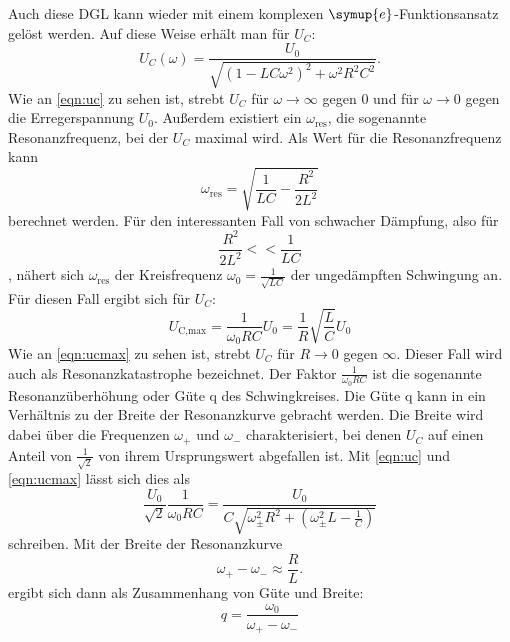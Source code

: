 \noindent Auch diese DGL kann wieder mit einem komplexen $\symup{e}$-Funktionsansatz gelöst werden. Auf diese Weise erhält man für $U_C$:
\begin{equation}
    U_C(\omega) = \frac{U_0}{\sqrt{(1-LC\omega^2)^2 + \omega^2 R^2 C^2}}.
    \label{eqn:uc}
\end{equation}
\noindent Wie an \autoref{eqn:uc} zu sehen ist, strebt $U_C$ für $\omega \to \infty $ gegen 0 und für $\omega \to 0$ gegen die Erregerspannung $U_0$. Außerdem existiert ein $\omega_{\text{res}}$, die sogenannte Resonanzfrequenz, bei der $U_C$ maximal wird. Als Wert für die Resonanzfrequenz kann
\begin{equation}
    \omega_{\text{res}} = \sqrt{\frac{1}{LC}-\frac{R^2}{2L^2}} 
\end{equation}
\noindent berechnet werden. Für den interessanten Fall von schwacher Dämpfung, also für
\begin{equation*}
    \frac{R^2}{2L^2} << \frac{1}{LC}
\end{equation*}
, nähert sich $\omega_{\text{res}}$ der Kreisfrequenz $\omega_0=\frac{1}{\sqrt{LC}}$ der ungedämpften Schwingung an. Für diesen Fall ergibt sich für $U_C$:
\begin{equation}
    U_{\text{C,max}} = \frac{1}{\omega_0 RC} U_0 = \frac{1}{R} \sqrt{\frac{L}{C}} U_0 
    \label{eqn:ucmax}
\end{equation}
Wie an \autoref{eqn:ucmax} zu sehen ist, strebt $U_C$ für $R \to 0 $ gegen $\infty$. Dieser Fall wird auch als Resonanzkatastrophe bezeichnet. Der Faktor $\frac{1}{\omega_0 RC}$ ist die sogenannte Resonanzüberhöhung oder Güte q des Schwingkreises.
\newline
Die Güte q kann in ein Verhältnis zu der Breite der Resonanzkurve gebracht werden. Die Breite wird dabei über die Frequenzen  $\omega_+$ und $\omega_-$ charakterisiert, bei denen $U_C$ auf einen Anteil von $\frac{1}{\sqrt{2}}$ von ihrem Ursprungswert abgefallen ist. Mit \autoref{eqn:uc} und \autoref{eqn:ucmax} lässt sich dies als
\begin{equation}
    \frac{U_0}{\sqrt{2}} \frac{1}{\omega_0 RC} = \frac{U_0}{C \sqrt{\omega^2_{\pm} R^2 + ( \omega^2_{\pm}L - \frac{1}{C} ) }}
\end{equation} 
schreiben. Mit der Breite der Resonanzkurve
\begin{equation}
    \omega_+ - \omega_- \approx \frac{R}{L}.
    \label{eqn:breite}
\end{equation}
ergibt sich dann als Zusammenhang von Güte und Breite:
\begin{equation}
    q = \frac{\omega_0}{\omega_+ - \omega_-}
    \label{eqn:guete}
\end{equation}
